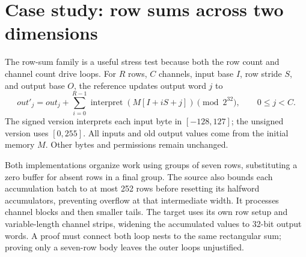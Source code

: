 \documentclass[11pt]{article}
\begin{document}
\section{Case study: row sums across two dimensions}
The row-sum family is a useful stress test because both the row count and channel count drive loops. For $R$ rows, $C$ channels, input base $I$, row stride $S$, and output base $O$, the reference updates output word $j$ to
\[
 \mathit{out}'_j=\mathit{out}_j+
 \sum_{i=0}^{R-1}\operatorname{interpret}(M[I+iS+j])\pmod{2^{32}},
 \qquad 0\le j<C.
\]
The signed version interprets each input byte in $[-128,127]$; the unsigned version uses $[0,255]$. All inputs and old output values come from the initial memory $M$. Other bytes and permissions remain unchanged.

Both implementations organize work using groups of seven rows, substituting a zero buffer for absent rows in a final group. The source also bounds each accumulation batch to at most 252 rows before resetting its halfword accumulators, preventing overflow at that intermediate width. It processes channel blocks and then smaller tails. The target uses its own row setup and variable-length channel strips, widening the accumulated values to 32-bit output words. A proof must connect both loop nests to the same rectangular sum; proving only a seven-row body leaves the outer loops unjustified.
\end{document}
